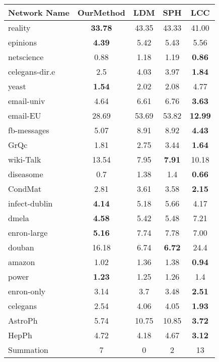 \begin{tabular}{|l|cccc|}
    \hline
     \textbf{Network Name}    & \textbf{OurMethod} & \textbf{LDM}  & \textbf{SPH}  & \textbf{LCC}  \\ \hline
     \hline
    reality        & \textbf{33.78}     & 43.35 & 43.33 & 41.00    \\ \hline
    epinions       & \textbf{4.39}      & 5.42  & 5.43  & 5.56  \\ \hline
    netscience     & 0.88      & 1.18  & 1.19  & \textbf{0.86}  \\ \hline
    celegans-dir.e & 2.5       & 4.03  & 3.97  & \textbf{1.84}  \\ \hline
    yeast          & \textbf{1.54}      & 2.02  & 2.08  & 4.77  \\ \hline
    email-univ     & 4.64      & 6.61  & 6.76  & \textbf{3.63}  \\ \hline
    email-EU       & 28.69     & 53.69 & 53.82 & \textbf{12.99} \\ \hline
    fb-messages    & 5.07      & 8.91  & 8.92  & \textbf{4.43}  \\ \hline
    GrQc           & 1.81      & 2.75  & 3.44  & \textbf{1.64}  \\ \hline
    wiki-Talk      & 13.54     & 7.95  & \textbf{7.91}  & 10.18 \\ \hline
    diseasome      & 0.7       & 1.38  & 1.4   & \textbf{0.66}  \\ \hline
    CondMat        & 2.81      & 3.61  & 3.58  & \textbf{2.15}  \\ \hline
    infect-dublin  & \textbf{4.14}      & 5.18  & 5.66  & 4.17  \\ \hline
    dmela          & \textbf{4.58}      & 5.42  & 5.48  & 7.21  \\ \hline
    enron-large    & \textbf{5.16}      & 7.74  & 7.78  & 7.00     \\ \hline
    douban         & 16.18     & 6.74  & \textbf{6.72}  & 24.4  \\ \hline
    amazon         & 1.02      & 1.36  & 1.38  & \textbf{0.94}  \\ \hline
    power          & \textbf{1.23}      & 1.25  & 1.26  & 1.4   \\ \hline
    enron-only     & 3.14      & 3.7   & 3.48  & \textbf{2.51}  \\ \hline
    celegans       & 2.54      & 4.06  & 4.05  & \textbf{1.93}  \\ \hline
    AstroPh        & 5.74      & 10.75 & 10.85 & \textbf{3.72}  \\ \hline
    HepPh          & 4.72      & 4.18  & 4.67  & \textbf{3.12}  \\ \hline
    \hline
    Summation          & 7      & 0 & 2 & 13 \\ \hline
    \end{tabular}